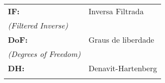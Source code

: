 \documentclass[msc,numbers]{formating/coppe}
\begin{document}
\tableofcontents
% 
\noindent
{\small
\begin{tabular}{lp{12cm}}
{\bf{IF:}} & \raggedright {Inversa Filtrada} \\ {\emph{(Filtered Inverse)}}\tabularnewline
{\bf{DoF:}} & \raggedright {Graus de liberdade} \\ {\emph{(Degrees of Freedom)}}\tabularnewline
{\bf{DH:}} & \raggedright {Denavit-Hartenberg} \\ \tabularnewline
\end{tabular}
}
\mainmatter


	


\backmatter



\appendix


\end{document}
